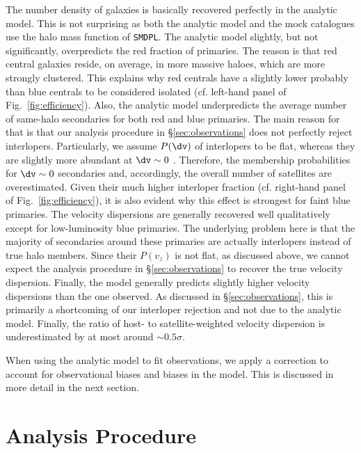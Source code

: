 \documentclass[fleqn,usenatbib,useAMS]{mnras}
\begin{document}
	The number density of galaxies is basically recovered perfectly in the analytic model. This is not surprising as both the analytic model and the mock catalogues use the halo mass function of \texttt{SMDPL}. The analytic model slightly, but not significantly, overpredicts the red fraction of primaries. The reason is that red central galaxies reside, on average, in more massive haloes, which are more strongly clustered. This explains why red centrals have a slightly lower probably than blue centrals to be considered isolated (cf. left-hand panel of Fig.~\ref{fig:efficiency}). Also, the analytic model underpredicts the average number of same-halo secondaries for both red and blue primaries. The main reason for that is that our analysis procedure in \S\ref{sec:observations} does not perfectly reject interlopers. Particularly, we assume $P(\dv)$ of interlopers to be flat, whereas they are slightly more abundant at $\dv \sim 0$ \citep[see][]{vdBosch+04, More+09b}. Therefore, the membership probabilities for $\dv \sim 0$ secondaries and, accordingly, the overall number of satellites are overestimated. Given their much higher interloper fraction (cf. right-hand panel of Fig.~\ref{fig:efficiency}), it is also evident why this effect is strongest for faint blue primaries. The velocity dispersions are generally recovered well qualitatively except for low-luminosity blue primaries. The underlying problem here is that the majority of secondaries around these primaries are actually interlopers instead of true halo members. Since their $P(v_z)$ is not flat, as discussed above, we cannot expect the analysis procedure in  \S\ref{sec:observations} to recover the true velocity dispersion. Finally, the model generally predicts slightly higher velocity dispersions than the one observed. As discussed in \S\ref{sec:observations}, this is primarily a shortcoming of our interloper rejection and not due to the analytic model. Finally, the ratio of host- to satellite-weighted velocity dispersion is underestimated by at most around $\sim 0.5 \sigma$. 
	
	When using the analytic model to fit observations, we apply a correction to account for observational biases and biases in the model. This is discussed in more detail in the next section.
	
	\section{Analysis Procedure}
	\label{sec:analysis}
	
\end{document}
